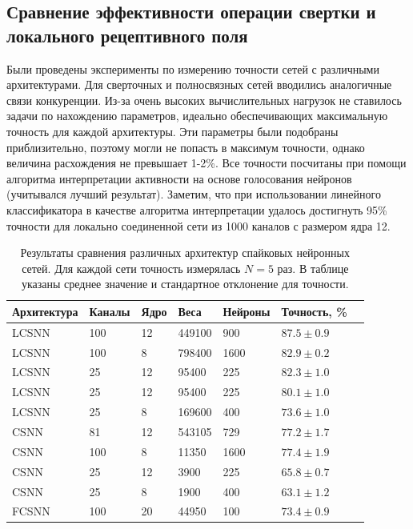 \documentclass[a4paper]{article}
\begin{document}
\subsection{Сравнение эффективности операции свертки и локального рецептивного поля}
Были проведены эксперименты по измерению точности сетей с различными архитектурами. Для сверточных и полносвязных сетей вводились аналогичные связи конкуренции. Из-за очень высоких вычислительных нагрузок не ставилось задачи по нахождению параметров, идеально обеспечивающих максимальную точность для каждой архитектуры. Эти параметры были подобраны приблизительно, поэтому могли не попасть в максимум точности, однако величина расхождения не превышает 1-2\%. Все точности посчитаны при помощи алгоритма интерпретации активности на основе голосования нейронов (учитывался лучший результат). Заметим, что при использовании линейного классификатора в качестве алгоритма интерпретации удалось достигнуть 95\% точности для локально соединенной сети из 1000 каналов с размером ядра 12.

\begin{table}[H]
 \caption{Результаты сравнения различных архитектур спайковых нейронных сетей. Для каждой сети точность измерялась $N=5$ раз. В таблице указаны среднее значение и стандартное отклонение для точности.}
\begin{center}
\begin{tabular}{|l|l|l|l|l|l|l|}
\hline
Архитектура & Каналы & Ядро & Веса & Нейроны & Точность, \% \\
\hline
{LCSNN} & {100} & {12} & {449100} & {900} & {$87.5 \pm 0.9$}\\
\hline
{LCSNN} & {100} & {8} & {798400} & {1600} & {$82.9 \pm 0.2$}\\
\hline
{LCSNN\footnotemark} & {25} & {12} & {95400} & {225} & {$82.3 \pm 1.0$}\\
\hline
{LCSNN} & {25} & {12} & {95400} & {225} & {$80.1 \pm 1.0$}\\
\hline
{LCSNN} & {25} & {8} & {169600} & {400} & {$73.6 \pm 1.0$}\\
\hline
{CSNN} & {81} & {12} & {543105} & {729} & {$77.2 \pm 1.7$}\\
\hline
{CSNN} & {100} & {8} & {11350} & {1600} & {$77.4 \pm 1.9$}\\
\hline
{CSNN} & {25} & {12} & {3900} & {225} & {$65.8 \pm 0.7$}\\
\hline
{CSNN} & {25} & {8} & {1900} & {400} & {$63.1 \pm 1.2$}\\
\hline
{FCSNN} & {100} & {20} & {44950} & {100} & {$73.4 \pm 0.9$}\\
\hline
\end{tabular}
\end{center}
\end{table}
\end{document}
